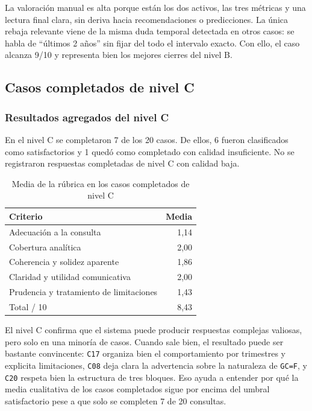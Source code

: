 La valoraci\'on manual es alta porque est\'an los dos activos, las tres m\'etricas y una lectura final clara, sin deriva 
hacia recomendaciones o predicciones. La \'unica rebaja relevante viene de la misma duda temporal detectada en otros casos: 
se habla de ``\'ultimos 2 a\~nos'' sin fijar del todo el intervalo exacto. Con ello, el caso alcanza 9/10 y representa bien 
los mejores cierres del nivel B.

\subsection{Casos completados de nivel C}

\subsubsection{Resultados agregados del nivel C}

En el nivel C se completaron 7 de los 20 casos. De ellos, 6 fueron clasificados como satisfactorios y 1 qued\'o como 
completado con calidad insuficiente. No se registraron respuestas completadas de nivel C con calidad baja.

\begin{table}[h]
\centering
\begin{tabular}{lr}
\toprule
Criterio & Media \\
\midrule
Adecuaci\'on a la consulta & 1,14 \\
Cobertura anal\'itica & 2,00 \\
Coherencia y solidez aparente & 1,86 \\
Claridad y utilidad comunicativa & 2,00 \\
Prudencia y tratamiento de limitaciones & 1,43 \\
Total / 10 & 8,43 \\
\bottomrule
\end{tabular}
\caption{Media de la r\'ubrica en los casos completados de nivel C}
\label{tab:media-c}
\end{table}

El nivel C confirma que el sistema puede producir respuestas complejas valiosas, pero solo en una minor\'ia de casos. 
Cuando sale bien, el resultado puede ser bastante convincente: \texttt{C17} organiza bien el comportamiento por trimestres y 
explicita limitaciones, \texttt{C08} deja clara la advertencia sobre la naturaleza de \texttt{GC=F}, y \texttt{C20} 
respeta bien la estructura de tres bloques. Eso ayuda a entender por qu\'e la media cualitativa de los casos completados 
sigue por encima del umbral satisfactorio pese a que solo se completen 7 de 20 consultas.

